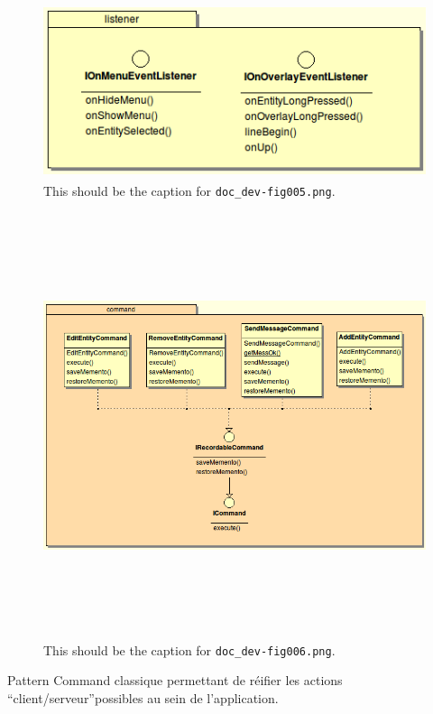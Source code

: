 \documentclass{article}
\begin{document}
\begin{figure}[htbp]
\begin{center}
\includegraphics[width=332pt, height=145pt]{doc_dev-fig005.png}
\caption{This should be the caption for \texttt{doc\_dev-fig005.png}.}
\end{center}
\end{figure}

\begin{figure}[htbp]
\begin{center}
\includegraphics[width=542pt, height=353pt]{doc_dev-fig006.png}
\caption{This should be the caption for \texttt{doc\_dev-fig006.png}.}
\end{center}
\end{figure}

\vspace{41pt}
{\color{color01} Pattern Command classique permettant de réifier les actions ``client/serveur''possibles 
au sein de l'application.}
\end{document}
